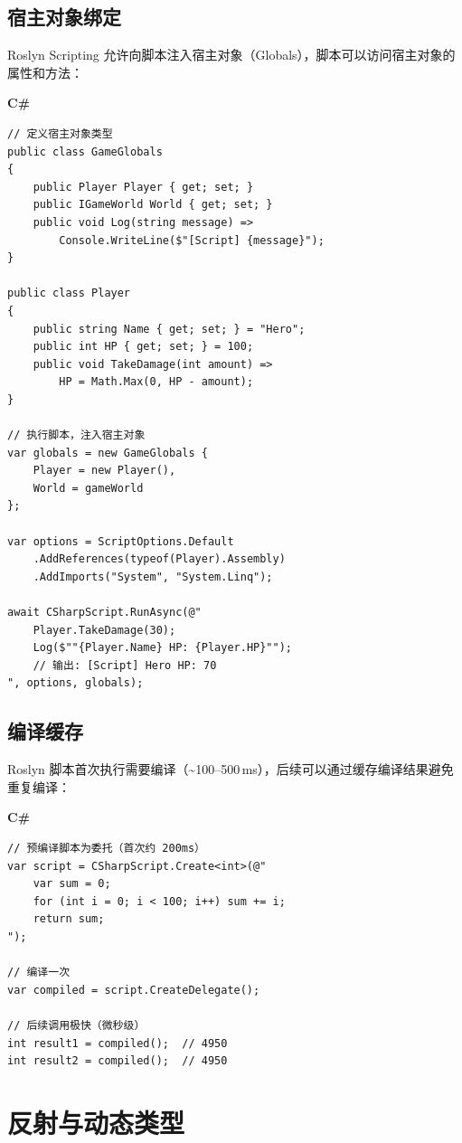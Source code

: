 \documentclass[12pt,a4paper,fontset=fandol]{ctexbook}
\newcommand{\csharplabel}{%
  \noindent\begin{tcolorbox}[colback=csharpheadbg,coltext=white,
    sharp corners,boxrule=0pt,width=3.2em,height=1.4em,
    halign=center,valign=center,nobeforeafter,left=0pt,right=0pt,
    top=0pt,bottom=0pt]\small\bfseries C\#\end{tcolorbox}}
\begin{document}
\section{宿主对象绑定}\label{sec:roslyn-host}

Roslyn Scripting 允许向脚本注入宿主对象（Globals），脚本可以访问宿主对象的属性和方法：

\csharplabel
\begin{lstlisting}[style=csharpstyle]
// 定义宿主对象类型
public class GameGlobals
{
    public Player Player { get; set; }
    public IGameWorld World { get; set; }
    public void Log(string message) =>
        Console.WriteLine($"[Script] {message}");
}

public class Player
{
    public string Name { get; set; } = "Hero";
    public int HP { get; set; } = 100;
    public void TakeDamage(int amount) =>
        HP = Math.Max(0, HP - amount);
}

// 执行脚本，注入宿主对象
var globals = new GameGlobals {
    Player = new Player(),
    World = gameWorld
};

var options = ScriptOptions.Default
    .AddReferences(typeof(Player).Assembly)
    .AddImports("System", "System.Linq");

await CSharpScript.RunAsync(@"
    Player.TakeDamage(30);
    Log($""{Player.Name} HP: {Player.HP}"");
    // 输出: [Script] Hero HP: 70
", options, globals);
\end{lstlisting}

\section{编译缓存}\label{sec:roslyn-cache}

Roslyn 脚本首次执行需要编译（\textasciitilde 100--500\,ms），后续可以通过缓存编译结果避免重复编译：

\csharplabel
\begin{lstlisting}[style=csharpstyle]
// 预编译脚本为委托（首次约 200ms）
var script = CSharpScript.Create<int>(@"
    var sum = 0;
    for (int i = 0; i < 100; i++) sum += i;
    return sum;
");

// 编译一次
var compiled = script.CreateDelegate();

// 后续调用极快（微秒级）
int result1 = compiled();  // 4950
int result2 = compiled();  // 4950
\end{lstlisting}


\chapter{反射与动态类型}\label{ch:reflection-dynamic}
\end{document}

